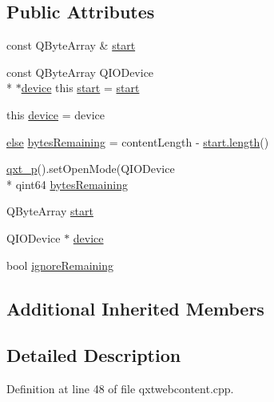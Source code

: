 \subsection*{Public Attributes}
\begin{DoxyCompactItemize}
\item 
const Q\-Byte\-Array \& \hyperlink{class_qxt_web_content_private_a418146d8701fb35c2720c16c56213b90}{start}
\item 
const Q\-Byte\-Array Q\-I\-O\-Device \\*
$\ast$\hyperlink{class_qxt_web_content_private_a77782ebb89b1d603985a8e8ce05e4e2d}{device} this \hyperlink{class_qxt_web_content_private_a2f968f984d86326928630d593d71d94f}{start} = \hyperlink{glext_8h_a13be19455586e95d5a42ed8f054afad2}{start}
\item 
this \hyperlink{class_qxt_web_content_private_a77782ebb89b1d603985a8e8ce05e4e2d}{device} = device
\item 
\hyperlink{uavobjecttemplate_8m_a8a6f3c552a6f8f07d85da9f0cff0459e}{else} \hyperlink{class_qxt_web_content_private_ade9b1a15db3ab579e66da79618b3195a}{bytes\-Remaining} = content\-Length -\/ \hyperlink{uavobjecttemplate_8m_a076bf56c9bafa07f3dbda4901a40d84c}{start.\-length}()
\item 
\hyperlink{class_qxt_private_a8a154f41226663dc0e9ddf1692f71be0}{qxt\-\_\-p}().set\-Open\-Mode(Q\-I\-O\-Device \\*
qint64 \hyperlink{class_qxt_web_content_private_af0ebe42ff9a32e2940c83e2d7f907a57}{bytes\-Remaining}
\item 
Q\-Byte\-Array \hyperlink{class_qxt_web_content_private_a608a06e4b9b4e84a5f883098844bf7a7}{start}
\item 
Q\-I\-O\-Device $\ast$ \hyperlink{class_qxt_web_content_private_a309c713920693032a8b46b8f8f22b562}{device}
\item 
bool \hyperlink{class_qxt_web_content_private_a7f5ec555a045feec02bebf526b6d7ef9}{ignore\-Remaining}
\end{DoxyCompactItemize}
\subsection*{Additional Inherited Members}


\subsection{Detailed Description}


Definition at line 48 of file qxtwebcontent.\-cpp.



